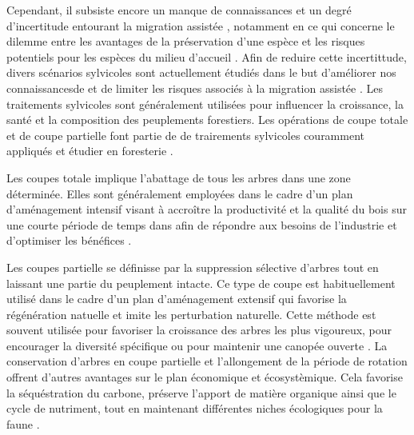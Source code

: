 Cependant, il subsiste encore un manque de connaissances et un degré d'incertitude entourant la migration assistée \citep{Park2018Informationunderload,Klenk2015assistedmigration}, 
notamment en ce qui concerne le dilemme entre les avantages de la préservation d'une espèce et les risques potentiels pour les espèces du milieu d'accueil \citep{Hewitt2011Takingstock,McLachlan2007frameworkdebate,Vitt2010Assistedmigration}.
Afin de reduire cette incertittude, divers scénarios sylvicoles sont actuellement étudiés dans le but d'améliorer nos connaissancesde et de limiter les risques associés à la migration assistée \citep{royoDesiredREgenerationAssisted2023}.
Les traitements sylvicoles sont généralement utilisées pour influencer la croissance, la santé et la composition des peuplements forestiers.
Les opérations de coupe totale et de coupe partielle font partie de de trairements sylvicoles couramment appliqués et étudier en foresterie \citep{Ameray2021Forestcarbon,Chaudhary2016Impactforest,Man2008Elevenyearresponses,MontoroGirona2018ConiferRegeneration,PamerleauCouture2015Effectthree}.

Les coupes totale implique l'abattage de tous les arbres dans une zone déterminée.
Elles sont généralement employées dans le cadre d'un plan d'aménagement intensif visant à accroître la productivité et la qualité du bois 
sur une courte période de temps dans afin de répondre aux besoins de l'industrie et d'optimiser les bénéfices \citep{Ameray2021Forestcarbon}.

Les coupes partielle se définisse par la suppression sélective d'arbres tout en laissant une partie du peuplement intacte. 
Ce type de coupe est habituellement utilisé dans le cadre d'un plan d'aménagement extensif qui favorise la régénération natuelle et imite les perturbation naturelle.
Cette méthode est souvent utilisée pour favoriser la croissance des arbres les plus vigoureux, pour encourager la diversité spécifique ou pour maintenir une canopée ouverte \citep{Ameray2021Forestcarbon,Irland2011Timberproductivity}.
La conservation d'arbres  en coupe partielle et l'allongement de la période de rotation offrent d'autres avantages sur le plan économique et écosystèmique. 
Cela favorise la séquéstration du carbone, préserve l'apport de matière organique ainsi que le cycle de nutriment, 
tout en maintenant différentes niches écologiques pour la faune \citep{Ameray2021Forestcarbon,Barg1999Influencepartial,Tong2020Forestmanagement}.

